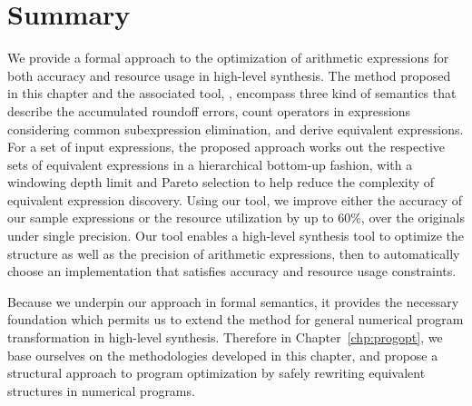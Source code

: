 \section{Summary}
\label{so:sec:conclusion}

We provide a formal approach to the optimization of arithmetic expressions
for both accuracy and resource usage in high-level synthesis. The method
proposed in this chapter and the associated tool, \soap, encompass three kind
of semantics that describe the accumulated roundoff errors, count operators in
expressions considering common subexpression elimination, and derive equivalent
expressions. For a set of input expressions, the proposed approach works out
the respective sets of equivalent expressions in a hierarchical bottom-up
fashion, with a windowing depth limit and Pareto selection to help reduce the
complexity of equivalent expression discovery. Using our tool, we improve
either the accuracy of our sample expressions or the resource utilization by
up to 60\%, over the originals under single precision. Our tool enables a
high-level synthesis tool to optimize the structure as well as the precision
of arithmetic expressions, then to automatically choose an implementation that
satisfies accuracy and resource usage constraints.

Because we underpin our approach in formal semantics, it provides the necessary
foundation which permits us to extend the method for general numerical program
transformation in high-level synthesis. Therefore in Chapter~\ref{chp:progopt},
we base ourselves on the methodologies developed in this chapter, and propose
a structural approach to program optimization by safely rewriting equivalent
structures in numerical programs.
